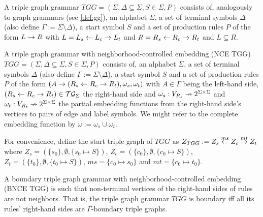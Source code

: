\documentclass[]{report}
\begin{document}
\begin{definition}
	\label{def:stgg}
	A triple graph grammar $TGG = (\Sigma, \Delta \subseteq \Sigma, S \in \Sigma, P)$ consists of, analogously to graph grammars (see \ref{def:gg}), an alphabet $\Sigma$, a set of terminal symbols $\Delta$ (also define $\Gamma := \Sigma \setminus \Delta$), a start symbol $S$ and a set of production rules $P$ of the form $L \to R$ with $L = L_s \overset{}{\leftarrow} L_c \overset{}{\rightarrow} L_t$ and $R = R_s \overset{}{\leftarrow} R_c \overset{}{\rightarrow} R_t$ and $L \subseteq R.$
\end{definition}

\begin{definition}
	A triple graph grammar with neighborhood-controlled embedding (NCE TGG) $TGG = (\Sigma, \Delta \subseteq \Sigma, S \in \Sigma, P)$ consists of, an alphabet $\Sigma$, a set of terminal symbols $\Delta$ (also define $\Gamma := \Sigma \setminus \Delta$), a start symbol $S$ and a set of production rules $P$ of the form $(A \to (R_s \overset{}{\leftarrow} R_c \overset{}{\rightarrow} R_t), \omega_s, \omega_t)$ with $A \in \Gamma$ being the left-hand side, $(R_s \overset{}{\leftarrow} R_c \overset{}{\rightarrow} R_t) \in \mathcal{TG}_{\Sigma}$ the right-hand side and $\omega_s : V_{R_s} \nrightarrow 2^{\Sigma \times \Sigma}$ and $\omega_t : V_{R_t} \nrightarrow 2^{\Sigma \times \Sigma}$ the partial embedding functions from the right-hand side's vertices to pairs of edge and label symbols. We might refer to the complete embedding function by $\omega:= \omega_s \cup \omega_t$.
	
	For convenience, define the start triple graph of $TGG$ as $Z_{TGG} := Z_s \overset{ms}{\leftarrow} Z_c \overset{mt}{\rightarrow} Z_t$ where $Z_s = (\{s_0\},\emptyset,\{s_0 \mapsto S\})$, $Z_c = (\{c_0\},\emptyset,\{c_0 \mapsto S\})$, $Z_t = (\{t_0\},\emptyset,\{t_0 \mapsto S\})$, $ms = \{c_0 \mapsto s_0 \}$ and $mt = \{c_0 \mapsto t_0 \}$.
	
	
\end{definition}

\begin{definition}
	A boundary triple graph grammar with neighborhood-controlled embedding (BNCE TGG) is such that non-terminal vertices of the right-hand sides of rules are not neighbors. That is, the triple graph grammar $TGG$ is boundary iff all its rules' right-hand sides are $\Gamma\text{-boundary}$ triple graphs.
\end{definition}

\end{document}
